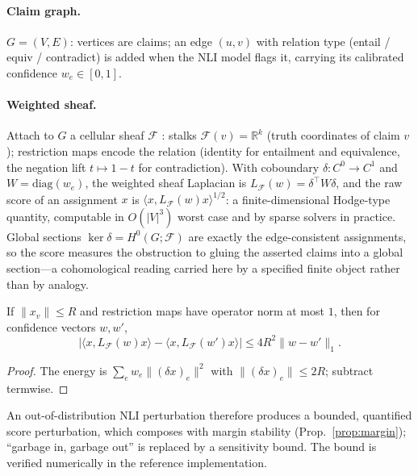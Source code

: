\paragraph{Claim graph.} $G=(V,E)$: vertices are claims; an edge $(u,v)$ with
relation type (entail / equiv / contradict) is added when the NLI model flags
it, carrying its calibrated confidence $w_e\in[0,1]$.

\paragraph{Weighted sheaf.} Attach to $G$ a cellular sheaf $\mathcal F$
\cite{hansen2019}: stalks $\mathcal F(v)=\mathbb R^k$ (truth coordinates of
claim $v$); restriction maps encode the relation (identity for entailment and
equivalence, the negation lift $t\mapsto 1-t$ for contradiction). With
coboundary $\delta:C^0\to C^1$ and $W=\mathrm{diag}(w_e)$, the weighted sheaf
Laplacian is $L_{\mathcal F}(w)=\delta^\top W\delta$, and the raw score of an
assignment $x$ is $\langle x,L_{\mathcal F}(w)x\rangle^{1/2}$: a
finite-dimensional Hodge-type quantity, computable in $O(|V|^3)$ worst case
and by sparse solvers in practice. Global sections
$\ker\delta=H^0(G;\mathcal F)$ are exactly the edge-consistent assignments, so
the score measures the obstruction to gluing the asserted claims into a global
section---a cohomological reading carried here by a specified finite object
rather than by analogy.

\begin{proposition}
\label{prop:lipschitz}
If $\|x_v\|\le R$ and restriction maps have operator norm at most $1$, then
for confidence vectors $w,w'$,
\[
\bigl|\langle x,L_{\mathcal F}(w)x\rangle-\langle x,L_{\mathcal F}(w')x\rangle\bigr|
\le 4R^2\|w-w'\|_1 .
\]
\end{proposition}
\begin{proof}
The energy is $\sum_e w_e\|(\delta x)_e\|^2$ with $\|(\delta x)_e\|\le 2R$;
subtract termwise.
\end{proof}

An out-of-distribution NLI perturbation therefore produces a bounded,
quantified score perturbation, which composes with margin stability
(Prop.~\ref{prop:margin}); ``garbage in, garbage out'' is replaced by a
sensitivity bound. The bound is verified numerically in the reference
implementation.

